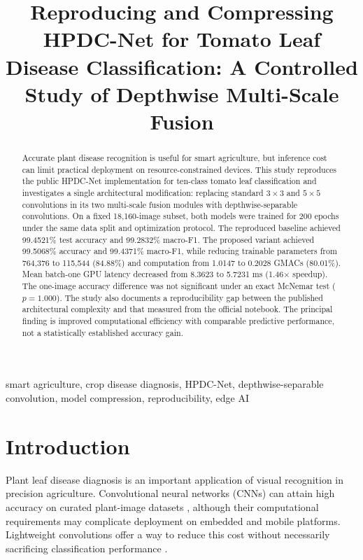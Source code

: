 \documentclass[conference,10pt]{IEEEtran}
\begin{document}
\title{Reproducing and Compressing HPDC-Net for Tomato Leaf Disease Classification: A Controlled Study of Depthwise Multi-Scale Fusion}

\author{
}
\maketitle

\begin{abstract}
Accurate plant disease recognition is useful for smart agriculture, but inference cost can limit practical deployment on resource-constrained devices. This study reproduces the public HPDC-Net implementation for ten-class tomato leaf classification and investigates a single architectural modification: replacing standard $3\times3$ and $5\times5$ convolutions in its two multi-scale fusion modules with depthwise-separable convolutions. On a fixed 18,160-image subset, both models were trained for 200 epochs under the same data split and optimization protocol. The reproduced baseline achieved 99.4521\% test accuracy and 99.2832\% macro-F1. The proposed variant achieved 99.5068\% accuracy and 99.4371\% macro-F1, while reducing trainable parameters from 764,376 to 115,544 (84.88\%) and computation from 1.0147 to 0.2028 GMACs (80.01\%). Mean batch-one GPU latency decreased from 8.3623 to 5.7231 ms (1.46$\times$ speedup). The one-image accuracy difference was not significant under an exact McNemar test ($p=1.000$). The study also documents a reproducibility gap between the published architectural complexity and that measured from the official notebook. The principal finding is improved computational efficiency with comparable predictive performance, not a statistically established accuracy gain.
\end{abstract}

\begin{IEEEkeywords}
smart agriculture, crop disease diagnosis, HPDC-Net, depthwise-separable convolution, model compression, reproducibility, edge AI
\end{IEEEkeywords}

\section{Introduction}
Plant leaf disease diagnosis is an important application of visual recognition in precision agriculture. Convolutional neural networks (CNNs) can attain high accuracy on curated plant-image datasets \cite{mohanty2016}, although their computational requirements may complicate deployment on embedded and mobile platforms. Lightweight convolutions offer a way to reduce this cost without necessarily sacrificing classification performance \cite{sandler2018}.
\end{document}
